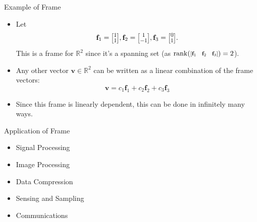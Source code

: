 \documentclass{beamer}
\newcommand{\RR}{\mathbb{R}}
\renewcommand{\vec}[1]{\mathbf{#1}}
\newcommand{\ivec}[2][.8]{%
  \scalebox{#1}{%
    \renewcommand{\arraystretch}{.8}%
    $\begin{bmatrix}#2\end{bmatrix}$%
  }
}
\begin{document}
\begin{frame}{Example of Frame}
  \begin{itemize}
    \item <1-> Let
    \[
        \vec{f}_1 = \ivec{1\\1}, \vec{f}_2 = \ivec{1\\-1}, \vec{f}_3 = \ivec{0\\1}.
    \]
    This is a frame for $\RR^2$ since it's a spanning set (as $\operatorname{rank}(\ivec{\vec{f}_1 & \vec{f}_2 & \vec{f}_3}) = 2$).

    \item <2-> Any other vector $\vec{v}\in\RR^2$ can be written as a linear combination of the frame vectors:
    \[
        \vec{v} = c_1\vec{f}_1 + c_2\vec{f}_2 + c_3\vec{f}_3
    \]

    \item <3-> Since this frame is linearly dependent, this can be done in infinitely many ways.
  \end{itemize}
\end{frame}

\begin{frame}{Application of Frame}
  \begin{itemize}

  \item Signal Processing
  
  \item Image Processing
  
  \item Data Compression
  
  \item Sensing and Sampling
  
  \item Communications
  
  \cite{casazza2012finite}
  \end{itemize}
\end{frame}
\end{document}

